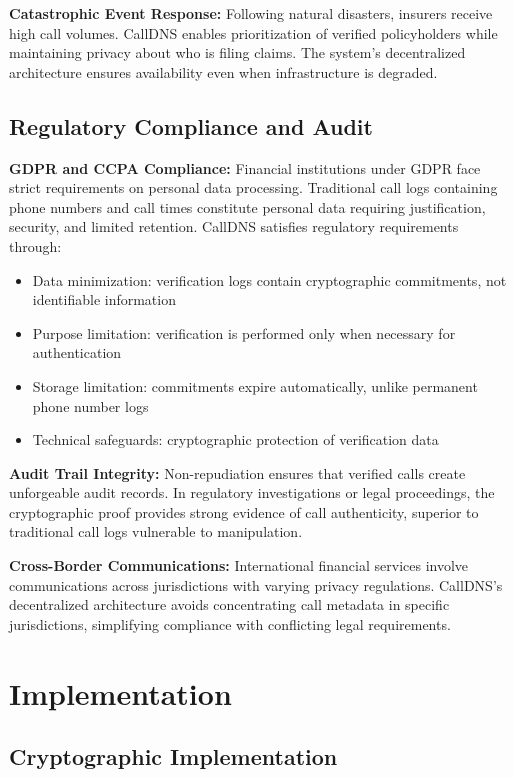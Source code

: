\documentclass[11pt,twocolumn]{article}
\begin{document}
\textbf{Catastrophic Event Response:} Following natural disasters, insurers receive high call volumes. CallDNS enables prioritization of verified policyholders while maintaining privacy about who is filing claims. The system's decentralized architecture ensures availability even when infrastructure is degraded.

\subsection{Regulatory Compliance and Audit}

\textbf{GDPR and CCPA Compliance:} Financial institutions under GDPR face strict requirements on personal data processing. Traditional call logs containing phone numbers and call times constitute personal data requiring justification, security, and limited retention. CallDNS satisfies regulatory requirements through:
\begin{itemize}
\item Data minimization: verification logs contain cryptographic commitments, not identifiable information
\item Purpose limitation: verification is performed only when necessary for authentication
\item Storage limitation: commitments expire automatically, unlike permanent phone number logs
\item Technical safeguards: cryptographic protection of verification data
\end{itemize}

\textbf{Audit Trail Integrity:} Non-repudiation ensures that verified calls create unforgeable audit records. In regulatory investigations or legal proceedings, the cryptographic proof provides strong evidence of call authenticity, superior to traditional call logs vulnerable to manipulation.

\textbf{Cross-Border Communications:} International financial services involve communications across jurisdictions with varying privacy regulations. CallDNS's decentralized architecture avoids concentrating call metadata in specific jurisdictions, simplifying compliance with conflicting legal requirements.

\section{Implementation}

\subsection{Cryptographic Implementation}
\end{document}
